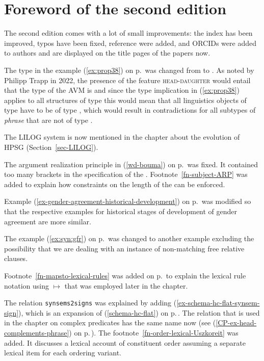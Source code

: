 \section*{Foreword of the second edition}

\largerpage
The second edition comes with a lot of small improvements: the index has been improved, typos have
been fixed, reference were added, and ORCIDs were added to authors and are displayed on the title pages of the papers now.

The type in the example (\ref{ex:prop38})
on p.\,\pageref{ex:prop38} was changed from  to . As noted by
Philipp Trapp in 2022, the presence of the feature \textsc{head-daughter} would entail that the type
of the AVM is  and since the type implication in (\ref{ex:prop38}) applies to all
structures of type  this would mean that all linguistics objects of type  have to be
of type , which would result in contradictions for all subtypes of \emph{phrase}
that are not of type .

The LILOG system is now mentioned in the chapter about the evolution of HPSG (Section~\ref{sec-LILOG}).

The argument realization principle in (\ref{wd-bouma}) on p.\,\pageref{wd-bouma} was fixed. It
contained too many brackets in the specification of the \depsl. Footnote~\ref{fn-subject-ARP} was
added to explain how constraints on the length of the \subjl can be enforced.

Example (\ref{ex-gender-agreement-historical-development}) on
p.\,\pageref{ex-gender-agreement-historical-development} was modified so that the respective
examples for historical stages of development of gender agreement are more similar.

The example (\ref{ex:syn:gfr}) on p.\,\pageref{ex:syn:gfr} was changed to another example excluding the possibility that we
are dealing with an instance of non-matching free relative clauses.

Footnote~\ref{fn-mapsto-lexical-rules} was added on p.\,\pageref{fn-mapsto-lexical-rules} to explain
the lexical rule notation using $\mapsto$ that was employed later in the chapter. 

The relation \texttt{synsems2signs} was explained by adding (\ref{ex-schema-hc-flat-synsem-sign}),
which is an expansion of (\ref{schema-hc-flat}) on p.\,\pageref{schema-hc-flat}. The relation that
is used in the chapter on complex predicates has the same name now (see
(\ref{CP-ex-head-complements-phrase}) on p.\,\pageref{CP-ex-head-complements-phrase}). The
footnote~\ref{fn-order-lexical-Uszkoreit} was added. It discusses a lexical account of constituent
order assuming a separate lexical item for each ordering variant.

